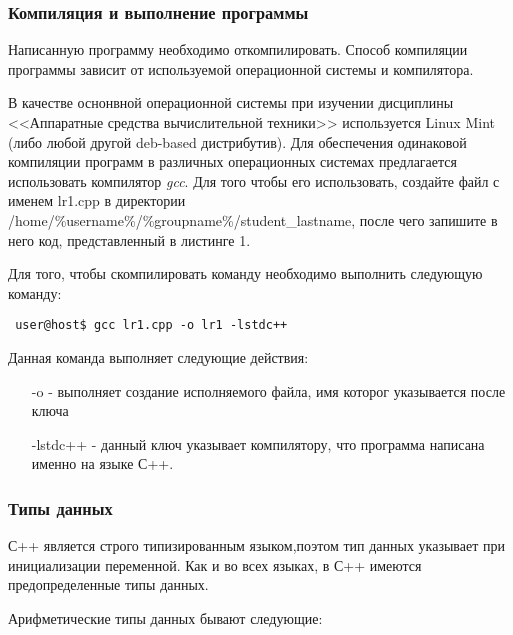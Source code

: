 \documentclass[a4paper,report,14pt]{ncc}
\begin{document}
\subsubsection{Компиляция и выполнение программы}

Написанную программу необходимо откомпилировать. Способ компиляции программы зависит от используемой операционной системы и компилятора.

В качестве оснонвной операционной системы при изучении дисциплины <<Аппаратные средства вычислительной техники>> используется Linux Mint (либо любой другой deb-based дистрибутив). Для обеспечения одинаковой компиляции программ в различных операционных системах предлагается использовать компилятор \textit{gcc}. Для того чтобы его использовать, создайте файл с именем lr1.cpp в директории \\ /home/\%username\%/\%groupname\%/student\_lastname, после чего запишите в него код, представленный в листинге 1.

Для того, чтобы скомпилировать команду необходимо выполнить следующую команду:

\begin{verbatim}
 user@host$ gcc lr1.cpp -o lr1 -lstdc++
\end{verbatim}

Данная команда выполняет следующие действия:

\begin{itemize}
 \item[-o] - выполняет создание исполняемого файла, имя которог указывается после ключа
 \item[-lstdc++] - данный ключ указывает компилятору, что программа написана именно на языке С++.
\end{itemize}

\subsubsection{Типы данных}

С++ является строго типизированным языком,поэтом тип данных указывает при инициализации переменной. Как и во всех языках, в С++ имеются предопределенные типы данных.

Арифметические типы данных бывают следующие:
\end{document}
